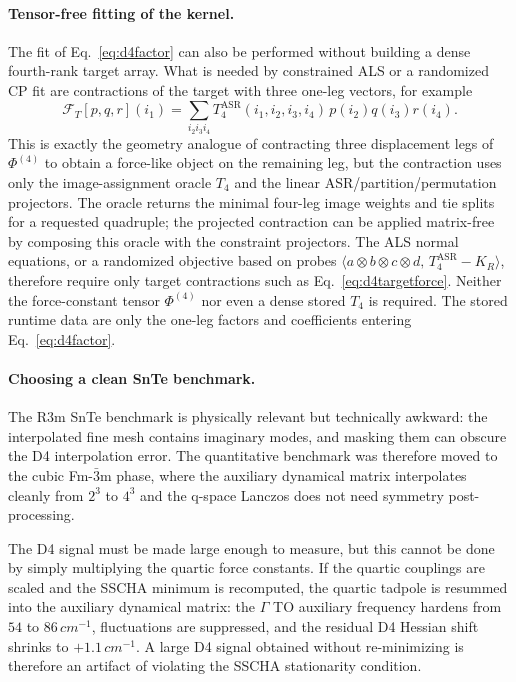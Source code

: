 \documentclass[11pt,a4paper]{article}
\begin{document}
\paragraph{Tensor-free fitting of the kernel.}
The fit of Eq.~\eqref{eq:d4factor} can also be performed without building a
dense fourth-rank target array.  What is needed by constrained ALS or a
randomized CP fit are contractions of the target with three one-leg
vectors, for example
\begin{equation}
\mathcal F_T[p,q,r](i_1)
 = \sum_{i_2i_3i_4}
T_4^{\mathrm{ASR}}(i_1,i_2,i_3,i_4)\,
p(i_2)q(i_3)r(i_4).
\label{eq:d4targetforce}
\end{equation}
This is exactly the geometry analogue of contracting three displacement
legs of $\Phi^{(4)}$ to obtain a force-like object on the remaining leg,
but the contraction uses only the image-assignment oracle $T_4$ and the
linear ASR/partition/permutation projectors.  The oracle returns the
minimal four-leg image weights and tie splits for a requested quadruple;
the projected contraction can be applied matrix-free by composing this
oracle with the constraint projectors.  The ALS normal equations, or a
randomized objective based on probes
$\langle a\otimes b\otimes c\otimes d,\,T_4^{\mathrm{ASR}}-K_R\rangle$,
therefore require only target contractions such as
Eq.~\eqref{eq:d4targetforce}.  Neither the force-constant tensor
$\Phi^{(4)}$ nor even a dense stored $T_4$ is required.  The stored runtime
data are only the one-leg factors and coefficients entering
Eq.~\eqref{eq:d4factor}.

\paragraph{Choosing a clean SnTe benchmark.}
The R3m SnTe benchmark is physically relevant but technically awkward:
the interpolated fine mesh contains imaginary modes, and masking them can
obscure the D4 interpolation error.  The quantitative benchmark was
therefore moved to the cubic Fm-$\bar 3$m phase, where the auxiliary
dynamical matrix interpolates cleanly from $2^3$ to $4^3$ and the q-space
Lanczos does not need symmetry post-processing.

The D4 signal must be made large enough to measure, but this cannot be done
by simply multiplying the quartic force constants.  If the quartic
couplings are scaled and the SSCHA minimum is recomputed, the quartic
tadpole is resummed into the auxiliary dynamical matrix: the $\Gamma$ TO
auxiliary frequency hardens from $54$ to $86\,\si{cm^{-1}}$, fluctuations
are suppressed, and the residual D4 Hessian shift shrinks to
$+1.1\,\si{cm^{-1}}$.  A large D4 signal obtained without re-minimizing is
therefore an artifact of violating the SSCHA stationarity condition.
\end{document}
